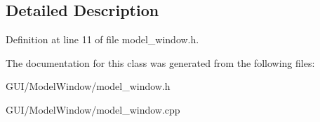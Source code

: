 \subsection{Detailed Description}


Definition at line 11 of file model\+\_\+window.\+h.



The documentation for this class was generated from the following files\+:\begin{DoxyCompactItemize}
\item 
G\+U\+I/\+Model\+Window/model\+\_\+window.\+h\item 
G\+U\+I/\+Model\+Window/model\+\_\+window.\+cpp\end{DoxyCompactItemize}
